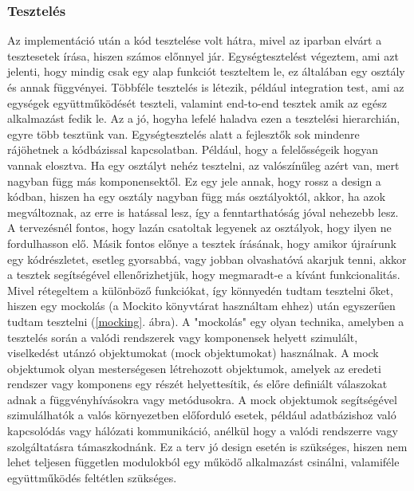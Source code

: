 \documentclass[a4paper,twoside]{article}
\begin{document}
\subsubsection{Tesztelés}
Az implementáció után a kód tesztelése volt hátra, mivel az iparban elvárt a tesztesetek írása, hiszen számos előnnyel jár.
Egységtesztelést végeztem, ami azt jelenti, hogy mindig csak egy alap funkciót teszteltem le, ez általában egy osztály és annak függvényei. Többféle tesztelés is létezik, például integration test, ami az egységek együttműködését teszteli, valamint end-to-end tesztek amik az egész alkalmazást fedik le. Az a jó, hogyha lefelé haladva ezen a tesztelési hierarchián, egyre több tesztünk van. Egységtesztelés 
alatt a fejlesztők sok mindenre rájöhetnek a kódbázissal kapcsolatban. Például, hogy a felelősségeik hogyan vannak elosztva. Ha egy osztályt nehéz tesztelni, az valószínűleg azért van, mert nagyban függ más komponensektől. Ez egy jele annak, hogy rossz a design a kódban, hiszen ha egy osztály nagyban függ más osztályoktól, akkor, ha azok megváltoznak, az erre is hatással lesz, így a fenntarthatóság jóval nehezebb lesz. A tervezésnél fontos, hogy lazán csatoltak legyenek az osztályok, hogy ilyen ne fordulhasson elő. Másik fontos előnye a tesztek írásának, hogy amikor újraírunk egy kódrészletet, esetleg gyorsabbá, vagy jobban olvashatóvá akarjuk tenni, akkor a tesztek segítségével ellenőrizhetjük, hogy megmaradt-e a kívánt funkcionalitás.  Mivel rétegeltem a különböző funkciókat, így könnyedén tudtam tesztelni őket, hiszen
egy mockolás (a Mockito \cite{mockito} könyvtárat használtam ehhez) után egyszerűen tudtam tesztelni (\ref{mocking}. ábra).
A "mockolás" egy olyan technika, amelyben a tesztelés során a valódi rendszerek vagy
komponensek helyett szimulált, viselkedést utánzó objektumokat (mock objektumokat) használnak.
A mock objektumok olyan mesterségesen létrehozott objektumok, amelyek az
eredeti rendszer vagy komponens egy részét helyettesítik, és előre definiált válaszokat adnak a
függvényhívásokra vagy metódusokra. A mock objektumok segítségével szimulálhatók a
valós környezetben előforduló esetek, például adatbázishoz való kapcsolódás vagy hálózati
kommunikáció, anélkül hogy a valódi rendszerre vagy szolgáltatásra támaszkodnánk. Ez a terv jó design esetén is szükséges, hiszen nem lehet teljesen független modulokból egy működő alkalmazást csinálni, valamiféle együttműködés feltétlen szükséges. 
\end{document}
